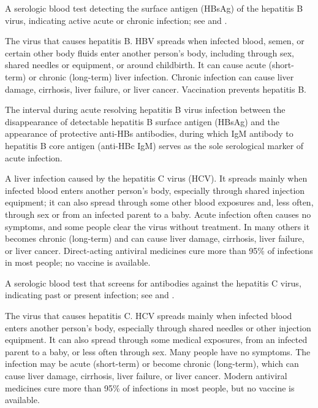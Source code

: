  A serologic blood test detecting the surface antigen (HBsAg) of the hepatitis B virus, indicating active acute or chronic infection; see  and .

 The virus that causes hepatitis B. HBV spreads when infected blood, semen, or certain other body fluids enter another person’s body, including through sex, shared needles or equipment, or around childbirth. It can cause acute (short-term) or chronic (long-term) liver infection. Chronic infection can cause liver damage, cirrhosis, liver failure, or liver cancer. Vaccination prevents hepatitis B.

 The interval during acute resolving hepatitis B virus infection between the disappearance of detectable hepatitis B surface antigen (HBsAg) and the appearance of protective anti-HBs antibodies, during which IgM antibody to hepatitis B core antigen (anti-HBc IgM) serves as the sole serological marker of acute infection.

 A liver infection caused by the hepatitis C virus (HCV). It spreads mainly when infected blood enters another person’s body, especially through shared injection equipment; it can also spread through some other blood exposures and, less often, through sex or from an infected parent to a baby. Acute infection often causes no symptoms, and some people clear the virus without treatment. In many others it becomes chronic (long-term) and can cause liver damage, cirrhosis, liver failure, or liver cancer. Direct-acting antiviral medicines cure more than 95\% of infections in most people; no vaccine is available.

 A serologic blood test that screens for antibodies against the hepatitis C virus, indicating past or present infection; see  and .

 The virus that causes hepatitis C. HCV spreads mainly when infected blood enters another person’s body, especially through shared needles or other injection equipment. It can also spread through some medical exposures, from an infected parent to a baby, or less often through sex. Many people have no symptoms. The infection may be acute (short-term) or become chronic (long-term), which can cause liver damage, cirrhosis, liver failure, or liver cancer. Modern antiviral medicines cure more than 95\% of infections in most people, but no vaccine is available.


